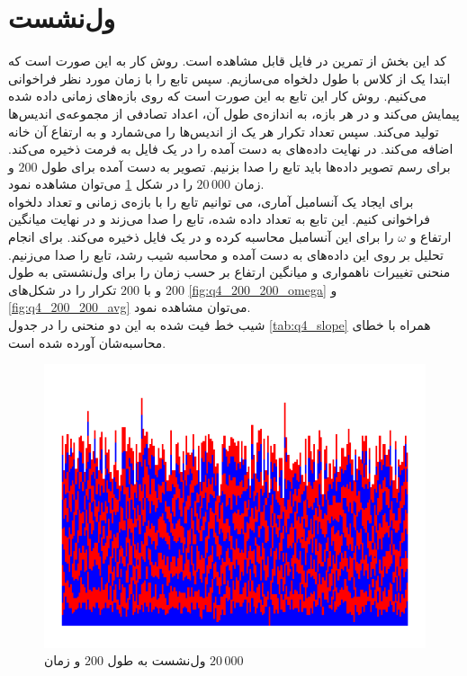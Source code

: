 \documentclass[11pt, a4paper]{article}
\begin{document}
\section{\textbf{ول‌نشست}}
کد این بخش از تمرین در فایل
قابل مشاهده است. روش کار به این صورت است که ابتدا یک
از کلاس
با طول دلخواه می‌سازیم. سپس تابع
را با زمان مورد نظر فراخوانی می‌کنیم. روش کار این تابع به این صورت است که روی بازه‌های زمانی داده شده
پیمایش می‌کند و در هر بازه، به اندازه‌ی طول آن، اعداد تصادفی از مجموعه‌ی اندیس‌ها تولید می‌کند. 
سپس تعداد تکرار هر یک از اندیس‌ها را می‌شمارد و به ارتفاع آن خانه اضافه می‌کند.
در نهایت داده‌های به دست آمده را در یک فایل به فرمت
ذخیره می‌کند.
برای رسم تصویر داده‌ها باید تابع
را صدا بزنیم.
تصویر به دست آمده برای طول
$200$
و زمان
$20\,000$
را در شکل
\ref{fig:q4_201_20000}
می‌توان مشاهده نمود.
\\
برای ایجاد یک آنسامبل آماری، می توانیم تابع
را با بازه‌ی زمانی و تعداد دلخواه فراخوانی کنیم. 
این تابع به تعداد داده شده، تابع
را صدا می‌زند و در نهایت میانگین ارتفاع و 
$\omega$
را برای این آنسامبل محاسبه کرده و در یک فایل ذخیره می‌کند.
برای انجام تحلیل بر روی این داده‌های به دست آمده و محاسبه شیب رشد، تابع
را صدا می‌زنیم.
منحنی تغییرات ناهمواری و میانگین ارتفاع بر حسب زمان را برای ول‌نشستی به طول
$200$
و با
$200$
تکرار را در شکل‌های
\ref{fig:q4_200_200_omega}
و
\ref{fig:q4_200_200_avg}
می‌توان مشاهده نمود.
\\
شیب خط فیت شده به این دو منحنی را در جدول
\ref{tab:q4_slope}
همراه با خطا‌ی محاسبه‌شان آورده شده است.

\begin{figure}[h]
  \centering
  \includegraphics[width=.5\textwidth]{q4_201_20000.png}
  \caption{ول‌نشست به طول $200$ و زمان $20\,000$}
  \label{fig:q4_201_20000}
\end{figure}
\end{document}
